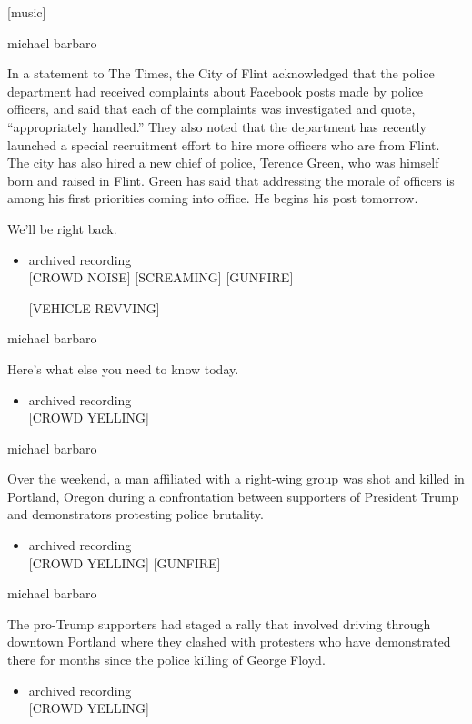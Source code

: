 {[}music{]}

michael barbaro

In a statement to The Times, the City of Flint acknowledged that the
police department had received complaints about Facebook posts made by
police officers, and said that each of the complaints was investigated
and quote, ``appropriately handled.'' They also noted that the
department has recently launched a special recruitment effort to hire
more officers who are from Flint. The city has also hired a new chief of
police, Terence Green, who was himself born and raised in Flint. Green
has said that addressing the morale of officers is among his first
priorities coming into office. He begins his post tomorrow.

We'll be right back.

\begin{itemize}
\item
  archived recording\\
  {[}CROWD NOISE{]} {[}SCREAMING{]} {[}GUNFIRE{]}

  {[}VEHICLE REVVING{]}
\end{itemize}

michael barbaro

Here's what else you need to know today.

\begin{itemize}
\tightlist
\item
  archived recording\\
  {[}CROWD YELLING{]}
\end{itemize}

michael barbaro

Over the weekend, a man affiliated with a right-wing group was shot and
killed in Portland, Oregon during a confrontation between supporters of
President Trump and demonstrators protesting police brutality.

\begin{itemize}
\tightlist
\item
  archived recording\\
  {[}CROWD YELLING{]} {[}GUNFIRE{]}
\end{itemize}

michael barbaro

The pro-Trump supporters had staged a rally that involved driving
through downtown Portland where they clashed with protesters who have
demonstrated there for months since the police killing of George Floyd.

\begin{itemize}
\tightlist
\item
  archived recording\\
  {[}CROWD YELLING{]}
\end{itemize}

